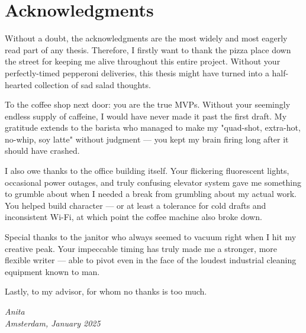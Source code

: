 \chapter{Acknowledgments}%
\label{chap:acknowledgements}

Without a doubt, the acknowledgments are the most widely and most eagerly read part of any thesis.
Therefore, I firstly want to thank the pizza place down the street for keeping me alive throughout this entire project. Without your perfectly-timed pepperoni deliveries, this thesis might have turned into a half-hearted collection of sad salad thoughts.

To the coffee shop next door: you are the true \glspl{MVP}. Without your seemingly endless supply of caffeine, I would have never made it past the first draft. My gratitude extends to the barista who managed to make my "quad-shot, extra-hot, no-whip, soy latte" without judgment --- you kept my brain firing long after it should have crashed.

I also owe thanks to the office building itself. Your flickering fluorescent lights, occasional power outages, and truly confusing elevator system gave me something to grumble about when I needed a break from grumbling about my actual work. You helped build character --- or at least a tolerance for cold drafts and inconsistent Wi-Fi, at which point the coffee machine also broke down.

Special thanks to the janitor who always seemed to vacuum right when I hit my creative peak. Your impeccable timing has truly made me a stronger, more flexible writer --- able to pivot even in the face of the loudest industrial cleaning equipment known to man.

Lastly, to my advisor, for whom no thanks is too much.

\begin{flushright}
{\makeatletter\itshape
    Anita \\
    Amsterdam, January 2025
\makeatother}
\end{flushright}


